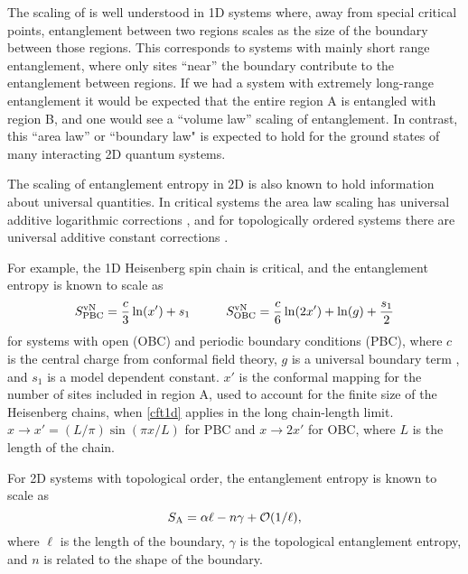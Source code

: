 The scaling of \vn is well understood in 1D systems \cite{ALreview} where, away from special critical points, entanglement between two regions scales as the size of the boundary between those regions.
This corresponds to systems with mainly short range entanglement, where only sites ``near'' the boundary contribute to the entanglement between regions.  
If we had a system with extremely long-range entanglement it would be expected that the entire region A is entangled with region B, and one would see a ``volume law'' scaling of entanglement. 
In contrast, this ``area law'' or ``boundary law" \cite{Shredder} is expected to hold for the ground states of many interacting 2D quantum systems.



The scaling of entanglement entropy in 2D is also known to hold information about universal quantities.
In critical systems the area law scaling has universal additive logarithmic corrections \cite{Casini2007,Ryu}, and for topologically ordered systems there are universal additive constant corrections \cite{KP,LW}.

For example, the 1D Heisenberg spin chain is critical, and the entanglement entropy is known to scale as \cite{Cardy} \cite{Zhou2006}
\begin{equation} \label{cft1d} 
	S^{\text{vN}}_{\text{PBC}} = \frac{c}{3}\ln(x') + s_1
	\hspace{1cm}
	S^{\text{vN}}_{\text{OBC}} = \frac{c}{6}\ln(2x') + \ln(g)+ \frac{s_1}{2}
\end{equation}
for systems with open (OBC) and periodic boundary conditions (PBC), where $c$ is the central charge from conformal field theory, $g$ is a universal boundary term \cite{AffleckAndLudwig}, and $s_1$ is a model dependent constant. $x'$ is the conformal mapping for the number of sites included in region A, used to account for the finite size of the Heisenberg chains, when \eqref{cft1d} applies in the long chain-length limit.  $x \rightarrow x' = (L/\pi)\sin(\pi x/L)$ for PBC and $x \rightarrow 2x'$ for OBC, where $L$ is the length of the chain.

For 2D systems with topological order, the entanglement entropy is known to scale as \cite{intro}
\begin{equation} \label{AL}
S_{\rm A} = \alpha \ell - n \gamma + \mathcal{O}(1/\ell),
\end{equation}
where $\ell$ is the length of the boundary, $\gamma$ is the topological entanglement entropy\cite{KP,LW}, and $n$ is related to the shape of the boundary.

